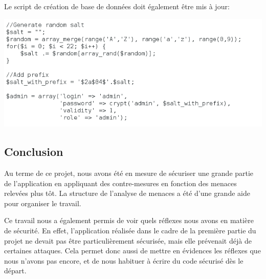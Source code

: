 \documentclass{article}
\begin{document}
Le script de création de base de données doit également être mis à jour:

\includegraphics[width=\textwidth]{images/crypt_apres5.PNG}

\subsection{Conclusion}

Au terme de ce projet, nous avons été en mesure de sécuriser une grande
partie de l'application en appliquant des contre-mesures en fonction des
menaces relevées plus tôt. La structure de l'analyse de menaces a été
d'une grande aide pour organiser le travail.

Ce travail nous a également permis de voir quels réflexes nous avons en
matière de sécurité. En effet, l'application réalisée dans le cadre de
la première partie du projet ne devait pas être particulièrement
sécurisée, mais elle prévenait déjà de certaines attaques. Cela permet
donc aussi de mettre en évidences les réflexes que nous n'avons pas
encore, et de nous habituer à écrire du code sécurisé dès le départ.
\end{document}
